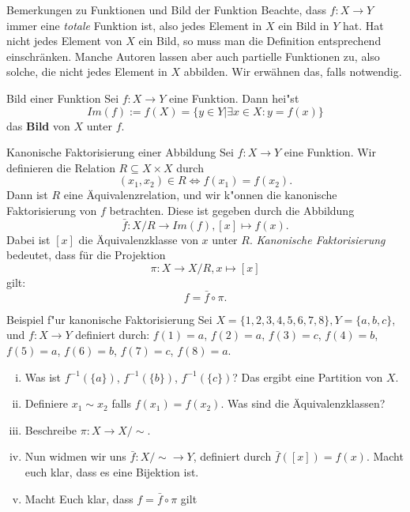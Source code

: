 \documentclass{beamer}
\begin{document}
\begin{frame}{Bemerkungen zu Funktionen und Bild der Funktion}
Beachte, dass $f:X\to Y$ immer eine \textit{totale} Funktion ist, also jedes Element in $X$ ein Bild in $Y$ hat. Hat nicht jedes Element von $X$ ein Bild, so muss man die Definition entsprechend einschränken. Manche Autoren lassen aber auch partielle Funktionen zu, also solche, die nicht jedes Element in $X$ abbilden. Wir erwähnen das, falls notwendig.

\begin{definition}{Bild einer Funktion}
  Sei $f:X\to Y$ eine Funktion. Dann hei"st \[Im(f):=f(X)=\{y\in Y|\exists x\in X:y=f(x)\}\] das \textbf{Bild} von $X$ unter $f$.
\end{definition}
\end{frame}
\begin{frame}{Kanonische Faktorisierung einer Abbildung}
  Sei $f:X\to Y$ eine Funktion. Wir definieren die Relation $R\subseteq X\times X$ durch \[(x_1,x_2)\in R\Leftrightarrow f(x_1)=f(x_2).\] Dann ist $R$ eine \"Aquivalenzrelation, und wir k"onnen die kanonische Faktorisierung von $f$ betrachten. Diese ist gegeben durch die Abbildung \[\bar{f}:X/R\to Im(f), [x]\mapsto f(x).\] Dabei ist $[x]$ die \"Aquivalenzklasse von $x$ unter $R$.
  \textit{Kanonische Faktorisierung} bedeutet, dass f\"ur die Projektion \[\pi:X\to X/R, x\mapsto[x]\] gilt: \[f=\bar{f}\circ\pi.\]
\end{frame}

\begin{frame}{Beispiel f"ur kanonische Faktorisierung}
Sei $X = \{1,2,3,4,5,6,7,8\}, Y=\{a,b,c\}$, und $f:X\to Y$ definiert durch: $f(1) = a$, $f(2) = a$, $f(3) = c$, $f(4) = b$, $f(5) = a$, $f(6) = b$, $f(7) = c$, $f(8) = a$. 
  \begin{enumerate}[(i)]
    \item Was ist $f^{-1}(\{a\})$, $f^{-1}(\{b\})$, $f^{-1}(\{c\})$? Das ergibt eine Partition von $X$.
    \item Definiere $x_1\sim x_2$ falls $f(x_1) = f(x_2)$. Was sind die \"Aquivalenzklassen? 
    \item Beschreibe $\pi : X\to X/\sim$. 
    \item Nun widmen wir uns $\bar{f} : X/\sim\to Y$, definiert durch $\bar{f}([x]) = f(x)$. Macht euch klar, dass es eine Bijektion ist. 
   \item Macht Euch klar, dass $f = \bar{f}\circ\pi$ gilt
  \end{enumerate}
\end{frame}

  
\end{document}
